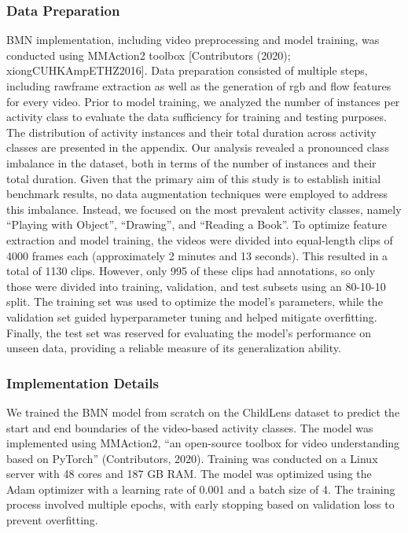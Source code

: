 \documentclass[
  man,floatsintext]{apa6}
\begin{document}
\subsubsection{Data Preparation}\label{data-preparation}

BMN implementation, including video preprocessing and model training, was conducted using MMAction2 toolbox {[}Contributors (2020); xiongCUHKAmpETHZ2016{]}. Data preparation consisted of multiple steps, including rawframe extraction as well as the generation of rgb and flow features for every video. Prior to model training, we analyzed the number of instances per activity class to evaluate the data sufficiency for training and testing purposes. The distribution of activity instances and their total duration across activity classes are presented in the appendix. Our analysis revealed a pronounced class imbalance in the dataset, both in terms of the number of instances and their total duration. Given that the primary aim of this study is to establish initial benchmark results, no data augmentation techniques were employed to address this imbalance. Instead, we focused on the most prevalent activity classes, namely ``Playing with Object'', ``Drawing'', and ``Reading a Book''. To optimize feature extraction and model training, the videos were divided into equal-length clips of 4000 frames each (approximately 2 minutes and 13 seconds). This resulted in a total of 1130 clips. However, only 995 of these clips had annotations, so only those were divided into training, validation, and test subsets using an 80-10-10 split. The training set was used to optimize the model's parameters, while the validation set guided hyperparameter tuning and helped mitigate overfitting. Finally, the test set was reserved for evaluating the model's performance on unseen data, providing a reliable measure of its generalization ability.

\subsubsection{Implementation Details}\label{implementation-details}

We trained the BMN model from scratch on the ChildLens dataset to predict the start and end boundaries of the video-based activity classes. The model was implemented using MMAction2, ``an open-source toolbox for video understanding based on PyTorch'' (Contributors, 2020). Training was conducted on a Linux server with 48 cores and 187 GB RAM. The model was optimized using the Adam optimizer with a learning rate of 0.001 and a batch size of 4. The training process involved multiple epochs, with early stopping based on validation loss to prevent overfitting.
\end{document}
